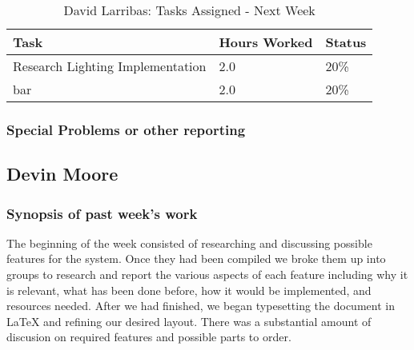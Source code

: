 \documentclass[12pt,article,compsoc]{IEEEtran}
\begin{document}
	\begin{table}[ht]
	\renewcommand{\arraystretch}{1.3}
		\caption{David Larribas: Tasks Assigned - Next Week}
		
		\label{Summary of David Larribas' activites: this week}
		
		\centering
		\begin{tabular}{p{5.5cm}|p{1cm}|p{1cm}}
		\hline

		\bfseries 	Task		 	                            	& \bfseries Hours Worked	& \bfseries Status	\\
		\hline\hline
					Research Lighting Implementation				& 2.0						& 20\%				\\
					bar				                            	& 2.0						& 20\%				\\	
		\hline
		\end{tabular}
	\end{table}

	\subsubsection*{Special Problems or other reporting}
	

\subsection{Devin Moore}

	\subsubsection*{Synopsis of past week's work}

	The beginning of the week consisted of researching and discussing possible features for the system. 
	Once they had been compiled we broke them up into groups to research and report the various
	aspects of each feature including why it is relevant, what has been done before, how it would be
	implemented, and resources needed. After we had finished, we began typesetting the document in \LaTeX
	and refining our desired layout. There was a substantial amount of discusion on required features and 
    possible parts to order.
\end{document}
